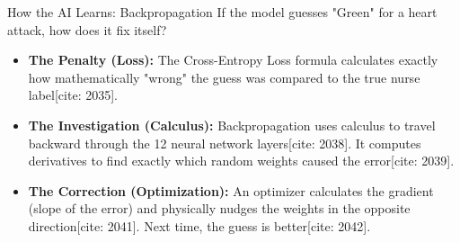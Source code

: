 \documentclass[10pt]{beamer}
\begin{document}
	\begin{frame}{How the AI Learns: Backpropagation}
		If the model guesses "Green" for a heart attack, how does it fix itself?
		
		\begin{itemize}
			\item \textbf{The Penalty (Loss):} The Cross-Entropy Loss formula calculates exactly how mathematically "wrong" the guess was compared to the true nurse label[cite: 2035].
			\item \textbf{The Investigation (Calculus):} Backpropagation uses calculus to travel backward through the 12 neural network layers[cite: 2038]. It computes derivatives to find exactly which random weights caused the error[cite: 2039].
			\item \textbf{The Correction (Optimization):} An optimizer calculates the gradient (slope of the error) and physically nudges the weights in the opposite direction[cite: 2041]. Next time, the guess is better[cite: 2042].
		\end{itemize}
	\end{frame}
	
\end{document}
